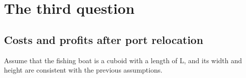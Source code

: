 \documentclass{mcmthesis}
\begin{document}
  \begin{figure}[htbp]
    \centering
    
    \centering
    \caption{}
  \end{figure}
  
\section{The third question}
\subsection{Costs and profits after port relocation}

Assume that the fishing boat is a cuboid with a length of L, and its width and height are consistent with the previous assumptions.
\end{document}
